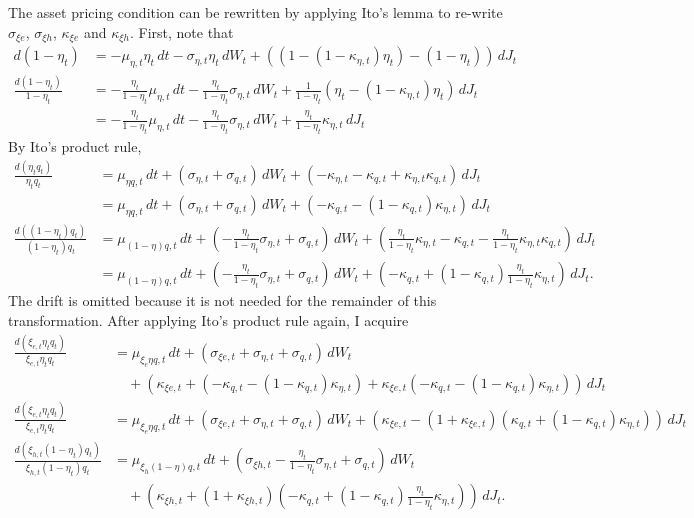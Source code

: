 \documentclass[12 pt, oneside]{article}
\theoremstyle{definition}
\theoremstyle{definition}
\theoremstyle{definition}
\begin{document}
The asset pricing condition can be rewritten by applying Ito's lemma to re-write $\sigma_{\xi e}$, $\sigma_{\xi h}$, $\kappa_{\xi e}$ and $\kappa_{\xi h}$. First, note that
\begin{align*}
  d(1 - \eta_t) & = - \mu_{\eta, t}\eta_t\, dt - \sigma_{\eta, t}\eta_t\, dW_t  + ((1 - (1 - \kappa_{\eta, t})\eta_t) - (1 - \eta_t))\, dJ_t  \\
\frac{d(1 - \eta_t)}{1 - \eta_t} & = -\frac{\eta_t}{1 - \eta_t}\mu_{\eta, t}\, dt - \frac{\eta_t}{1 - \eta_t}\sigma_{\eta, t}\, dW_t + \frac{1}{1 - \eta_t}(\eta_t-(1 - \kappa_{\eta, t})\eta_t )\, dJ_t\\
                & = -\frac{\eta_t}{1 - \eta_t}\mu_{\eta, t}\, dt - \frac{\eta_t}{1 - \eta_t}\sigma_{\eta, t}\, dW_t + \frac{\eta_t}{1 - \eta_t}\kappa_{\eta, t}\, dJ_t
\end{align*}
By Ito's product rule,
\begin{align*}
  \frac{d(\eta_t q_t)}{\eta_t q_t} & = \mu_{\eta q, t}\, dt  + (\sigma_{\eta, t} + \sigma_{q, t})\, dW_t  + (-\kappa_{\eta, t} - \kappa_{q, t} + \kappa_{\eta, t} \kappa_{q, t})\, dJ_t\\
  & = \mu_{\eta q, t}\, dt  + (\sigma_{\eta, t} + \sigma_{q, t})\, dW_t  + (-\kappa_{q, t} - (1- \kappa_{q, t}) \kappa_{\eta, t})\, dJ_t\\
  \frac{d((1 -\eta_t) q_t)}{(1 - \eta_t )q_t} & = \mu_{(1 - \eta) q, t}\, dt  + \left(-\frac{\eta_t}{1 - \eta_t}\sigma_{\eta, t} + \sigma_{q, t}\right)\, dW_t  + \left(\frac{\eta_t}{1 - \eta_t}\kappa_{\eta, t} - \kappa_{q, t} -\frac{\eta_t}{1 - \eta_t} \kappa_{\eta, t} \kappa_{q, t}\right)\, dJ_t\\
 & =\mu_{(1 - \eta) q, t}\, dt + \left(-\frac{\eta_t}{1 - \eta_t}\sigma_{\eta, t} + \sigma_{q, t}\right)\, dW_t  + \left(-\kappa_{q, t} +(1 - \kappa_{q, t})\frac{\eta_t}{1 - \eta_t}\kappa_{\eta, t}\right)\, dJ_t.
\end{align*}
The drift is omitted because it is not needed for the remainder of this transformation. After applying Ito's product rule again, I acquire
\begin{align*}
  \frac{d(\xi_{e, t}\eta_t q_t)}{\xi_{e, t}\eta_tq_t} & = \mu_{\xi_e \eta q, t}\, dt + (\sigma_{\xi e, t} + \sigma_{\eta, t} + \sigma_{q, t})\, dW_t\\
&\quad + (\kappa_{\xi e, t}+( -\kappa_{q, t} - (1- \kappa_{q, t}) \kappa_{\eta, t}) +  \kappa_{\xi e, t}(-\kappa_{q, t} - (1- \kappa_{q, t}) \kappa_{\eta, t}) )\, dJ_t \\
  \frac{d(\xi_{e, t}\eta_t q_t)}{\xi_{e, t}\eta_tq_t} & = \mu_{\xi_e \eta q, t}\, dt + (\sigma_{\xi e, t} + \sigma_{\eta, t} + \sigma_{q, t})\, dW_t + (\kappa_{\xi e, t}  - (1 + \kappa_{\xi e, t})(\kappa_{q, t} + (1- \kappa_{q, t}) \kappa_{\eta, t}))\, dJ_t\\
  \frac{d(\xi_{h, t}(1 -\eta_t) q_t)}{\xi_{h, t}(1 - \eta_t)q_t} & = \mu_{\xi_h (1 -\eta) q, t}\, dt + \left(\sigma_{\xi h, t} - \frac{\eta_t}{1 - \eta_t}\sigma_{\eta, t} + \sigma_{q, t}\right)\, dW_t\\
& \quad + \left(\kappa_{\xi h, t} + (1 + \kappa_{\xi h, t})\left( -\kappa_{q, t} + (1 - \kappa_{q, t})\frac{\eta_t}{1 - \eta_t}\kappa_{\eta, t}\right)\right)\, dJ_t.
\end{align*}
\end{document}
